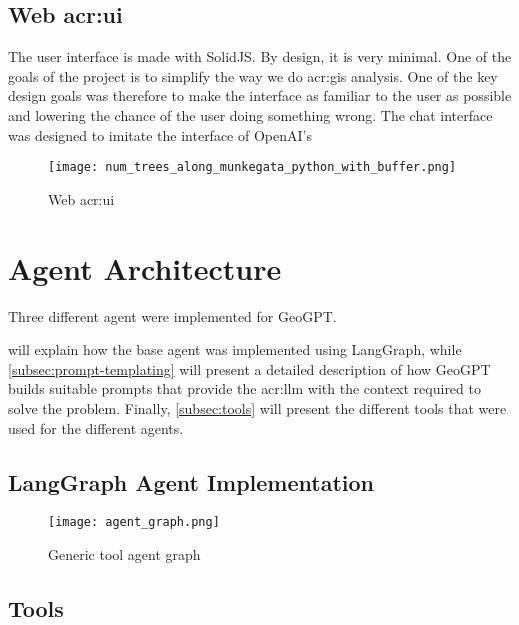 \subsection[Web UI]{Web \acrshort{acr:ui}}

The user interface is made with SolidJS. By design, it is very minimal. One of the goals of the project is to simplify the way we do \acrshort{acr:gis} analysis. One of the key design goals was therefore to make the interface as familiar to the user as possible and lowering the chance of the user doing something wrong. The chat interface was designed to imitate the interface of OpenAI's

\begin{figure}[h]
    \centering
    \texttt{[image: num\_trees\_along\_munkegata\_python\_with\_buffer.png]}
    \caption{Web \acrshort{acr:ui}}
    \label{fig:web-ui}
\end{figure}


\glsresetall



\section{Agent Architecture}

Three different agent were implemented for GeoGPT.

 will explain how the base agent was implemented using LangGraph, while \autoref{subsec:prompt-templating} will present a detailed description of how GeoGPT builds suitable prompts that provide the \acrshort{acr:llm} with the context required to solve the problem. Finally, \autoref{subsec:tools} will present the different tools that were used for the different agents.

\subsection{LangGraph Agent Implementation}
\label{subsec:lg-agent-implementation}

\begin{figure}[h]
    \centering
    \texttt{[image: agent\_graph.png]}
    \caption{Generic tool agent graph}
    \label{fig:tool-agent-graph}
\end{figure}

\subsection{Tools}
\label{subsec:tools}

